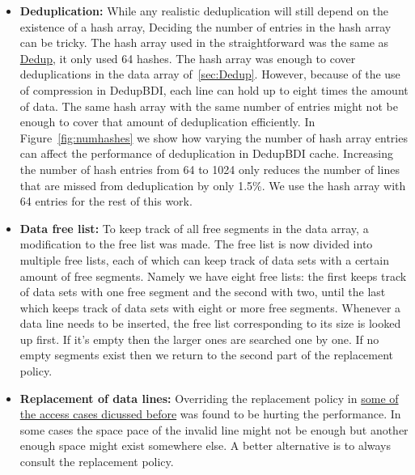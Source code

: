 \begin{itemize}
    \item \textbf{Deduplication:} While any realistic deduplication will still depend on the existence of a hash array, Deciding the number of entries in the hash array can be tricky. The hash array used in the straightforward was the same as \hyperref[sssec:DedupHash]{Dedup}, it only used 64 hashes. The hash array was enough to cover deduplications in the data array of~\ref{sec:Dedup}. However, because of the use of compression in DedupBDI, each line can hold up to eight times the amount of data. The same hash array with the same number of entries might not be enough to cover that amount of deduplication efficiently. In Figure~\ref{fig:numhashes} we show how varying the number of hash array entries can affect the performance of deduplication in DedupBDI cache. Increasing the number of hash entries from 64 to 1024 only reduces the number of lines that are missed from deduplication by only 1.5\%. We use the hash array with 64 entries for the rest of this work.
    \item \textbf{Data free list:} To keep track of all free segments in the data array, a modification to the free list was made. The free list is now divided into multiple free lists, each of which can keep track of data sets with a certain amount of free segments. Namely we have eight free lists: the first keeps track of data sets with one free segment and the second with two, until the last which keeps track of data sets with eight or more free segments. Whenever a data line needs to be inserted, the free list corresponding to its size is looked up first. If it's empty then the larger ones are searched one by one. If no empty segments exist then we return to the second part of the replacement policy.
    \item \textbf{Replacement of data lines:} Overriding the replacement policy in \hyperref[itm:override]{some of the access cases dicussed before} was found to be hurting the performance. In some cases the space pace of the invalid line might not be enough but another enough space might exist somewhere else. A better alternative is to always consult the replacement policy. 
\end{itemize}
